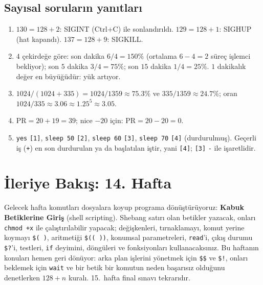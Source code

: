 \documentclass[11pt,a4paper]{article}
\newcommand{\cmd}[1]{\texttt{#1}}
\begin{document}
\subsection*{Sayısal soruların yanıtları}
\begin{enumerate}[leftmargin=1.6em,start=7]
  \item $130 = 128 + 2$: SIGINT (Ctrl+C) ile sonlandırıldı. $129 = 128 + 1$: SIGHUP (hat kapandı). $137 = 128 + 9$: SIGKILL.
  \item $4$ çekirdeğe göre: son dakika $6/4 = 150\%$ (ortalama $6 - 4 = 2$ süreç işlemci bekliyor); son $5$ dakika $3/4 = 75\%$; son $15$ dakika $1/4 = 25\%$. $1$ dakikalık değer en büyüğüdür: yük artıyor.
  \item $1024/(1024 + 335) = 1024/1359 \approx 75.3\%$ ve $335/1359 \approx 24.7\%$; oran $1024/335 \approx 3.06 \approx 1.25^{5} \approx 3.05$.
  \item $\text{PR} = 20 + 19 = 39$; nice $-20$ için: $\text{PR} = 20 - 20 = 0$.
  \item \cmd{yes} \texttt{[1]}, \cmd{sleep 50} \texttt{[2]}, \cmd{sleep 60} \texttt{[3]}, \cmd{sleep 70} \texttt{[4]} (durdurulmuş). Geçerli iş (\texttt{+}) en son durdurulan ya da başlatılan iştir, yani \texttt{[4]}; \texttt{[3]} \texttt{-} ile işaretlidir.
\end{enumerate}

\section{İleriye Bakış: 14. Hafta}

Gelecek hafta komutları dosyalara koyup programa dönüştürüyoruz: \textbf{Kabuk Betiklerine Giriş} (shell scripting). Shebang satırı olan betikler yazacak, onları \cmd{chmod +x} ile çalıştırılabilir yapacak; değişkenleri, tırnaklamayı, komut yerine koymayı \verb|$( )|, aritmetiği \verb|$(( ))|, konumsal parametreleri, \cmd{read}'i, çıkış durumu \verb|$?|'i, testleri, \texttt{if} deyimini, döngüleri ve fonksiyonları kullanacaksınız. Bu haftanın konuları hemen geri dönüyor: arka plan işlerini yönetmek için \verb|$$| ve \verb|$!|, onları beklemek için \cmd{wait} ve bir betik bir komutun neden başarısız olduğunu denetlerken $128 + n$ kuralı. 15.~hafta final sınavı tekrarıdır.
\end{document}
